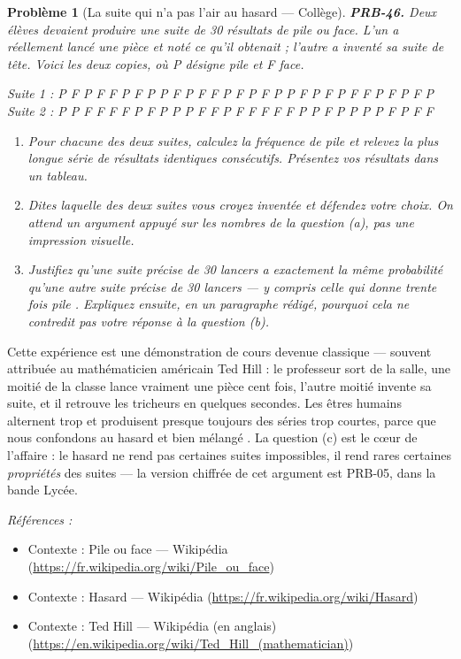 \documentclass[11pt]{article}
\newtheorem{problem}{Problème}
\newenvironment{refs}{\par\small\noindent\emph{Références :}\begin{itemize}\setlength\itemsep{0pt}}{\end{itemize}\normalsize}
\begin{document}
\bigskip

\begin{problem}[{La suite qui n'a pas l'air au hasard --- Collège}]
\textbf{PRB-46.} Deux élèves devaient produire une suite de 30 résultats de pile ou face. L'un a
réellement lancé une pièce et noté ce qu'il obtenait ; l'autre a inventé sa suite de tête. Voici
les deux copies, où P désigne pile et F face.

\noindent Suite 1 : P F P F F P F P P F P F F P F P F P P F P F P F F P F P F P 
Suite 2 : P P F F F F P F P P P F F P F F F F F P P F P P P P F P F F
\begin{enumerate}
\item[(a)] Pour chacune des deux suites, calculez la fréquence de \og{} pile \fg{} et relevez la plus longue série
de résultats identiques consécutifs. Présentez vos résultats dans un tableau.
\item[(b)] Dites laquelle des deux suites vous croyez inventée et défendez votre choix. On attend un
argument appuyé sur les nombres de la question (a), pas une impression visuelle.
\item[(c)] Justifiez qu'une suite précise de 30 lancers a exactement la même probabilité qu'une autre
suite précise de 30 lancers --- y compris celle qui donne trente fois \og{} pile \fg{}. Expliquez ensuite,
en un paragraphe rédigé, pourquoi cela ne contredit pas votre réponse à la question (b).
\end{enumerate}

\end{problem}

\noindent Cette expérience est une démonstration de cours devenue classique --- souvent
attribuée au mathématicien américain Ted Hill : le professeur sort de la salle, une moitié de la
classe lance vraiment une pièce cent fois, l'autre moitié invente sa suite, et il retrouve les
tricheurs en quelques secondes. Les êtres humains alternent trop et produisent presque toujours
des séries trop courtes, parce que nous confondons \og{} au hasard \fg{} et \og{} bien mélangé \fg{}. La question
(c) est le c\oe{}ur de l'affaire : le hasard ne rend pas certaines suites impossibles, il rend rares
certaines \textit{propriétés} des suites --- la version chiffrée de cet argument est PRB-05, dans la
bande Lycée.

\begin{refs}
\item Contexte : Pile ou face --- Wikipédia (\url{https://fr.wikipedia.org/wiki/Pile_ou_face})
\item Contexte : Hasard --- Wikipédia (\url{https://fr.wikipedia.org/wiki/Hasard})
\item Contexte : Ted Hill --- Wikipédia (en anglais) (\url{https://en.wikipedia.org/wiki/Ted_Hill_(mathematician)})
\end{refs}
\end{document}
